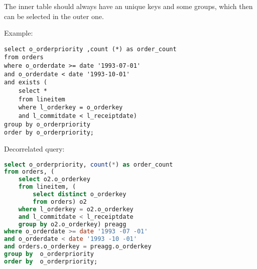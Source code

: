 The inner table should always have an unique keys and some groups, which then can be selected in the outer one.

Example:
\begin{lstlisting}
select o_orderpriority ,count (*) as order_count
from orders
where o_orderdate >= date '1993-07-01'
and o_orderdate < date '1993-10-01'
and exists (
	select * 
	from lineitem
	where l_orderkey = o_orderkey
	and l_commitdate < l_receiptdate)
group by o_orderpriority
order by o_orderpriority;
\end{lstlisting}

Decorrelated query:
\begin{lstlisting}[language=SQL]
select o_orderpriority, count(*) as order_count
from orders, (
	select o2.o_orderkey
	from lineitem, (
		select distinct o_orderkey 
		from orders) o2
	where l_orderkey = o2.o_orderkey
	and l_commitdate < l_receiptdate
	group by o2.o_orderkey) preagg
where o_orderdate >= date '1993 -07 -01' 
and o_orderdate < date '1993 -10 -01' 
and orders.o_orderkey = preagg.o_orderkey
group by  o_orderpriority
order by  o_orderpriority;
\end{lstlisting}
